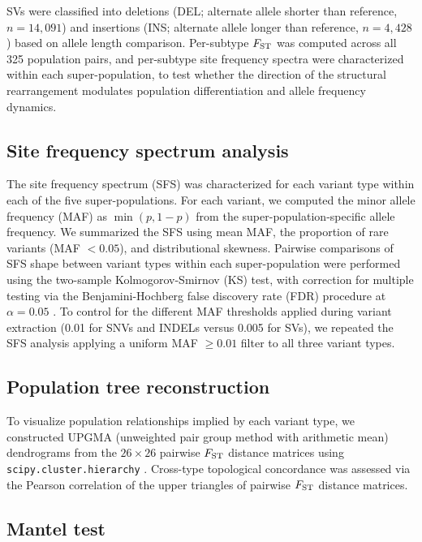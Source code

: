 SVs were classified into deletions (DEL; alternate allele shorter than reference, $n = 14{,}091$) and insertions (INS; alternate allele longer than reference, $n = 4{,}428$) based on allele length comparison. Per-subtype $F_\mathrm{ST}$ was computed across all 325 population pairs, and per-subtype site frequency spectra were characterized within each super-population, to test whether the direction of the structural rearrangement modulates population differentiation and allele frequency dynamics.

\subsection*{Site frequency spectrum analysis}

The site frequency spectrum (SFS) was characterized for each variant type within each of the five super-populations. For each variant, we computed the minor allele frequency (MAF) as $\min(p, 1-p)$ from the super-population-specific allele frequency. We summarized the SFS using mean MAF, the proportion of rare variants (MAF $< 0.05$), and distributional skewness. Pairwise comparisons of SFS shape between variant types within each super-population were performed using the two-sample Kolmogorov-Smirnov (KS) test, with correction for multiple testing via the Benjamini-Hochberg false discovery rate (FDR) procedure at $\alpha = 0.05$ \citep{benjamini1995}. To control for the different MAF thresholds applied during variant extraction (0.01 for SNVs and INDELs versus 0.005 for SVs), we repeated the SFS analysis applying a uniform MAF $\geq 0.01$ filter to all three variant types.

\subsection*{Population tree reconstruction}

To visualize population relationships implied by each variant type, we constructed UPGMA (unweighted pair group method with arithmetic mean) dendrograms from the $26 \times 26$ pairwise $F_\mathrm{ST}$ distance matrices using \texttt{scipy.cluster.hierarchy} \citep{virtanen2020}. Cross-type topological concordance was assessed via the Pearson correlation of the upper triangles of pairwise $F_\mathrm{ST}$ distance matrices.

\subsection*{Mantel test}

